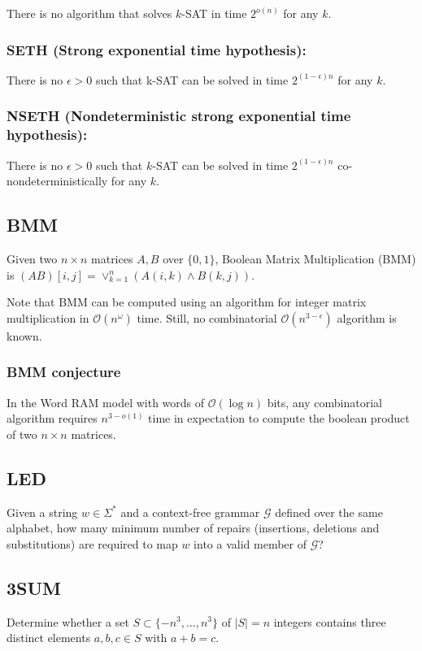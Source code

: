 \documentclass{amsart}
\begin{document}
	There is no algorithm that solves $k$-SAT in time $2^{o(n)}$ for any $k$.
	
	\subsubsection{SETH (Strong exponential time hypothesis):} 
	
	There is no $\epsilon > 0$ such that k-SAT can be solved in time $2^{(1-\epsilon)n}$ for any $k$.
	
	\subsubsection{NSETH (Nondeterministic strong exponential time hypothesis):} 
	
	There is no $\epsilon > 0$ such that $k$-SAT can be solved in time $2^{(1-\epsilon)n}$ co-nondeterministically for any $k$.
	
	\subsection{BMM}
	
	Given two $n \times n$ matrices $A, B$ over $\{0, 1\}$, Boolean Matrix Multiplication (BMM) is $(AB)[i,j] = \vee_{k = 1}^n (A(i,k) \wedge B(k, j))$. 
	
	Note that BMM can be computed using an algorithm for integer matrix multiplication in $\mathcal{O}(n^{\omega})$ time. Still, no combinatorial $\mathcal{O}(n^{3 - \epsilon})$ algorithm is known.
	
	\subsubsection{BMM conjecture~\cite{10.1109/FOCS.2014.53}}
	In the Word RAM model with words of $\mathcal{O}(\log n)$ bits, any combinatorial algorithm requires $n^{3 - o(1)}$ time in expectation to compute the boolean product of two $n \times n$ matrices.
	
	\subsection{LED}
	
	Given a string $w \in \Sigma^*$ and a context-free grammar $\mathcal{G}$ defined over the same alphabet, how many minimum number of repairs (insertions, deletions and substitutions) are required to map $w$ into a valid member of $\mathcal{G}$?
	
	\subsection{3SUM}
	Determine whether a set $S \subset \{-n^3, \ldots, n^3\}$ of $|S|= n$ integers contains three distinct elements $a, b, c \in S$ with $a + b = c$.
	
\end{document}
